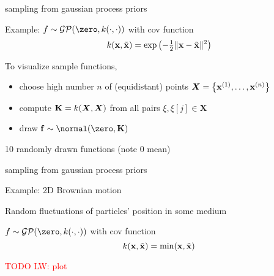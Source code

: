 \documentclass[11pt,compress,t,notes=noshow, xcolor=table]{beamer}
\begin{document}
\begin{framei}[sep=L]{sampling from gaussian process priors}
\item Example: $f \sim \mathcal{GP}(\zero, k(\cdot, \cdot))$ with cov function
$$ k(\mathbf{x}, \tilde{\mathbf{x}}) = \exp\left(-\tfrac{1}{2}\|\mathbf{x} - \tilde{\mathbf{x}}\|^2\right)$$
\item To visualize sample functions, 
\begin{itemize}
\item choose high number $n$ of (equidistant) points $\bm{X} = \left\{ \mathbf{x}^{(1)}, \ldots, \mathbf{x}^{(n)}\right\}$
  \item compute $\mathbf{K} = k(\bm{X}, \bm{X})$ from all pairs $\xi, \xi[j] \in \bm{X}$ 
  \item draw $\fv \sim \normal(\zero, \Kmat)$ 
\end{itemize}
\item 10 randomly drawn functions (note 0 mean)
\vfill
{}
\end{framei}

\begin{framei}[sep=L]{sampling from gaussian process priors}
\item Example: 2D Brownian motion
\item Random fluctuations of particles' position in some medium
\item $f \sim \mathcal{GP}(\zero, k(\cdot, \cdot))$ with cov function
$$ k(\mathbf{x}, \tilde{\mathbf{x}}) = \min (\mathbf{x}, \tilde{\mathbf{x}})$$
\item \textcolor{red}{TODO LW: plot}
\end{framei}

\endlecture
\end{document}
